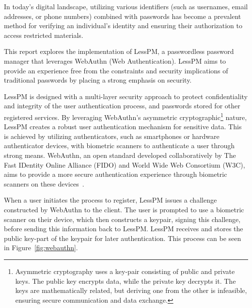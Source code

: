 


In today's digital landscape, utilizing various identifiers (such as usernames,
email addresses, or phone numbers) combined with passwords has become a
prevalent method for verifying an individual's identity and ensuring their
authorization to access restricted materials.

This report explores the implementation of LessPM, a passwordless password
manager that leverages WebAuthn (Web Authentication).
LessPM aims to provide an experience free from the constraints and security
implications of traditional passwords by placing a strong emphasis on
security.

LessPM is designed with a multi-layer security approach to protect
confidentiality and integrity of the user authentication process, and passwords
stored for other registered services.
By leveraging WebAuthn's asymmetric cryptographic\footnote{
  Asymmetric cryptography uses a key-pair consisting of public and private
  keys.
  The public key encrypts data, while the private key decrypts it.
  The keys are mathematically related, but deriving one from the other is
  infeasible, ensuring secure communication and data exchange.
} nature, LessPM creates a robust user authentication mechanism for sensitive
data.
This is achieved by utilizing authenticators, such as smartphones or
hardware authenticator devices, with biometric scanners to authenticate a
user through strong means.
WebAuthn, an open standard developed collaboratively by The Fast IDentity
Online Alliance (FIDO) and World Wide Web Consortium (W3C), aims to provide a
more secure authentication experience through biometric scanners on these
devices~\cite{webauthn-2}.

When a user initiates the process to register, LessPM issues a challenge
constructed by WebAuthn to the client.
The user is prompted to use a biometric scanner on their device, which then
constructs a keypair, signing this challenge, before sending this information
back to LessPM\@.
LessPM receives and stores the public key-part of the keypair for later
authentication.
This process can be seen in Figure~\ref{fig:webauthn}.

